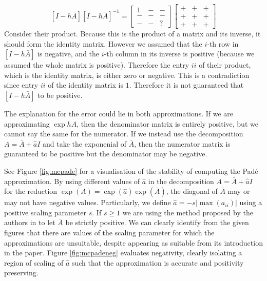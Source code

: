 \begin{equation*}
    \left[I - h\bar{A}\right] \left[I - h\bar{A}\right]^{-1} = \begin{bmatrix}
        1 & - & - \\
        - & - & - \\
        - & - & ?
    \end{bmatrix} \begin{bmatrix}
        + & + & + \\
        + & + & + \\
        + & + & +
    \end{bmatrix}
\end{equation*}
Consider their product. Because this is the product of a matrix and its inverse, it should form the identity matrix.
However we assumed that the $i$-th row in $[I - h\bar{A}]$ is negative, and the $i$-th column in its inverse is positive (because we assumed the whole matrix is positive).
Therefore the entry $ii$ of their product, which is the identity matrix, is either zero or negative. This is a contradiction since entry $ii$ of the identity matrix is $1$.
Therefore it is not guaranteed that $[I - h\bar{A}]$ to be positive.

The explanation for the error could lie in both approximations. If we are approximating $\exp{hA}$, then the denominator matrix is entirely positive, but we cannot say the same for the numerator.
If we instead use the decomposition $A = \bar{A} + \hat{a}I$ and take the exponenial of $\bar{A}$, then the numerator matrix is guaranteed to be positive but the denominator may be negative.

See Figure \ref{fig:mcpade} for a visualisation of the stability of computing the Pad\'e approximation.
By using different values of $\hat{a}$ in the decomposition $A = \bar{A} + \hat{a}I$ for the reduction $\exp(A) = \exp(\hat{a})\exp(\bar{A})$,
the diagonal of $\bar{A}$ may or may not have negative values.
Particularly, we define $\hat{a}= -s |\max(a_{ii})|$ using a positive scaling parameter $s$.
If $s\ge 1$ we are using the method proposed by the authors in \cite{blanes_pos_2022} to let $\bar{A}$ be strictly positive. 
We can clearly identify from the given figures that there are values of the scaling parameter for which the approximations are unsuitable, despite appearing as suitable from its introduction in the paper.
Figure \ref{fig:mcpadeneg} evaluates negativity, clearly isolating a region of scaling of $\hat{a}$ such that the approximation is accurate and positivity preserving.

